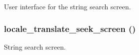 User interface for the string search screen. \hypertarget{group__locale_ga34fbb14f95e9ae562772895b284d170}{
\subsubsection[{locale\_\-translate\_\-seek\_\-screen}]{\setlength{\rightskip}{0pt plus 5cm}locale\_\-translate\_\-seek\_\-screen ()}}
\label{group__locale_ga34fbb14f95e9ae562772895b284d170}


String search screen. 